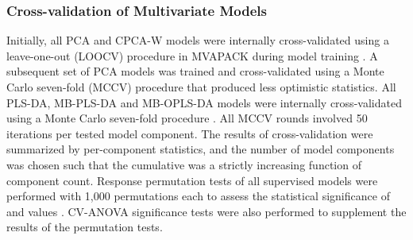 \subsubsection{Cross-validation of Multivariate Models}

\begin{doublespace}
Initially, all PCA and CPCA-W models were internally cross-validated using a
leave-one-out (LOOCV) procedure in MVAPACK during model training
\cite{eshghi:cils2014}. A subsequent set of PCA models was trained and
cross-validated using a Monte Carlo seven-fold (MCCV) procedure that
produced less optimistic \qsq{} statistics. All PLS-DA, MB-PLS-DA and
MB-OPLS-DA models were internally cross-validated using a Monte Carlo
seven-fold procedure \cite{wold:cils2001}. All MCCV rounds involved 50
iterations per tested model component. The results of cross-validation
were summarized by per-component \qsq{} statistics, and the number of model
components was chosen such that the cumulative \qsq{} was a strictly increasing
function of component count. Response permutation tests of all supervised
models were performed with 1,000 permutations each to assess the statistical
significance of \rsqy{} and \qsq{} values \cite{westerhuis:metab2008a}.
CV-ANOVA significance tests \cite{eriksson:jchemo2008} were also performed
to supplement the results of the permutation tests.
\end{doublespace}

